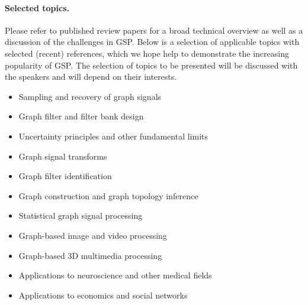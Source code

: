 \documentclass[a4paper]{scrartcl}
\begin{document}
\paragraph{Selected topics.}
Please refer to published review papers \cite{shuman_emerging_2013,
sandryhaila_discrete_2014, coifman_diffusion_2006, ekambaram_circulant_2013} for
a broad technical overview as well as a discussion of the challenges in GSP.
Below is a selection of applicable topics with selected (recent) references,
which we hope help to demonstrate the increasing popularity of GSP. The
selection of topics to be presented will be discussed with the speakers and will
depend on their interests.
\begin{itemize}
	\setlength{\itemsep}{0pt} \setlength{\parskip}{0pt}
	\item Sampling and recovery of graph signals \cite{puy2015random,tsitsvero2015signals,anis2014towards}
	\item Graph filter and filter bank design \cite{hammond2011wavelets,narang_bior_filters,ekambaram_globalsip,leonardi_multislice,leonardi_fmri,shuman2013spectrum}
	\item Uncertainty principles and other fundamental limits \cite{perraudin2016global,agaskar_spie,pasdeloup}
	\item Graph signal transforms \cite{szlam,gavish,Maggioni_biorthogonal,coifman_diffusion_2006,lafon_coarse,narang_lifting_graphs}
	\item Graph filter identification \cite{thanou_TSP_2014}
	\item Graph construction and graph topology inference \cite{kalofolias2016learn,Dong:2014tj}
	\item Statistical graph signal processing \cite{perraudin2016stationary,zhang2015graph,gadde2015probabilistic}
	\item Graph-based image and video processing \cite{elmoataz2008nonlocal,lezoray2008nonlocal,shahid2015fast}
	\item Graph-based 3D multimedia processing \cite{zhang2014point,
		thanou2015graph, nguyen2014compression, schoenenberger2015graph}
	\item Applications to neuroscience and other medical fields \cite{huang2015graph,hu2015spectral}
	\item Applications to economics and social networks

\end{itemize}
\end{document}
